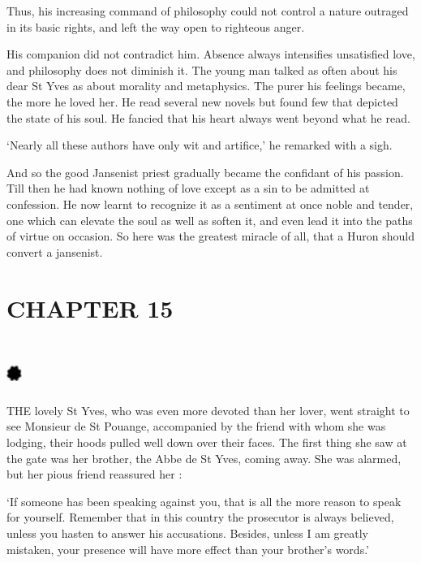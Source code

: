 \documentclass{article}
\begin{document}
\begin{center}
Thus, his increasing command of philosophy could not control a nature outraged 
in its basic rights, and left the way open to righteous anger. 

His companion did not contradict him. Absence always intensifies unsatisfied love, 
and philosophy does not diminish it. The young man talked as often about his dear 
St Yves as about morality and metaphysics. The purer his feelings became, the more 
he loved her. He read several new novels but found few that depicted the state 
of his soul. He fancied that his heart always went beyond what he read. 

`Nearly all these authors have only wit and artifice,' he remarked with a sigh. 

And so the good Jansenist priest gradually became the confidant of his passion. 
Till then he had known nothing of love except as a sin to be admitted at confession. 
He now learnt to recognize it as a sentiment at once noble and tender, one which 
can elevate the soul as well as soften it, and even lead it into the paths of virtue 
on occasion. So here was the greatest miracle of all, that a Huron should convert 
a jansenist.\pagebreak{} 

\section*{\textbf{CHAPTER 15  }}

\section*{%
\includegraphics[width=14pt, height=15pt, keepaspectratio=true]{Zadig or L'Ingenu - Voltaire-fig037.jpg}
}

 

THE lovely St Yves, who was even more devoted than her lover, went straight to 
see Monsieur de St Pouange, accompanied by the friend with whom she was lodging, 
their hoods pulled well down over their faces. The first thing she saw at the gate 
was her brother, the Abbe de St Yves, coming away. She was alarmed, but her pious 
friend reassured her : 

`If someone has been speaking against you, that is all the more reason to speak 
for yourself. Remember that in this country the prosecutor is always believed, 
unless you hasten to answer his accusations. Besides, unless I am greatly mistaken, 
your presence will have more effect than your brother's words.' 


\end{center}
\end{document}
